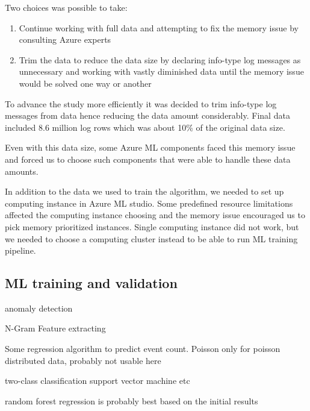 Two choices was possible to take:
\begin{enumerate}
    \item Continue working with full data
    and attempting to fix the memory issue
    by consulting Azure experts
    \item  Trim the data to reduce the data size
    by declaring info-type log messages
    as unnecessary
    and working with vastly diminished data
    until the memory issue would be solved
    one way or another
\end{enumerate}

To advance the study more efficiently
it was decided to trim info-type log messages from data
hence reducing the data amount considerably.
Final data included 8.6 million log rows
which was about 10\% of the original data size.

Even with this data size,
some Azure ML components faced this memory issue
and forced us to choose such components
that were able to handle these data amounts.


In addition to the data we used to train the algorithm,
we needed to set up computing instance
in Azure ML studio.
Some predefined resource limitations
affected the computing instance choosing
and the memory issue encouraged us
to pick memory prioritized instances.
Single computing instance did not work,
but we needed to choose a computing cluster instead
to be able to run ML training pipeline.



\subsection{ML training and validation}\label{subsec:ml-training-and-validation}

\begin{itcomment}
    anomaly detection

    N-Gram Feature extracting

    Some regression algorithm to predict event count.
    Poisson only for poisson distributed data, probably not usable here

    two-class classification
    support vector machine etc

    random forest regression is probably best based on the initial results
\end{itcomment}

